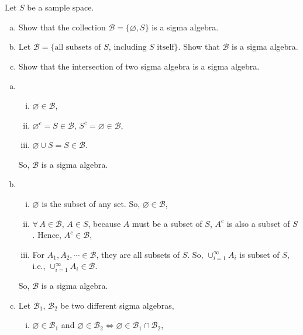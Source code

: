 \documentclass[12pt]{elegantbook}
\begin{document}
    \setcounter{exer}{10}
    \begin{exercise}
        Let $S$ be a sample space. 
        \begin{enumerate}[(a)]
            \item Show that the collection $\mathcal{B}=\{\varnothing, S\}$ is a sigma algebra. 
            \item Let $\mathcal{B}=\{\text{all subsets of $S$, including $S$ itself}\}$. Show that $\mathcal{B}$ is a sigma algebra. 
            \item Show that the intersection of two sigma algebra is a sigma algebra.
        \end{enumerate}
    \end{exercise}

    \begin{solution}
        \begin{enumerate}[(a)]
            \item \begin{enumerate}[(i)]
                \item $\varnothing \in \mathcal{B}$, 
                \item $\varnothing^c=S\in\mathcal{B}$, $S^c=\varnothing\in\mathcal{B}$, 
                \item $\varnothing\cup S=S\in\mathcal{B}$.
            \end{enumerate}
            So, $\mathcal{B}$ is a sigma algebra. 
            \item \begin{enumerate}[(i)]
                \item $\varnothing$ is the subset of any set. So, $\varnothing\in\mathcal{B}$, 
                \item $\forall\,A\in\mathcal{B}$, $A\in S$, because $A$ must be a subset of $S$, $A^c$ is also a subset of $S$. Hence, $A^c\in\mathcal{B}$, 
                \item For $A_1, A_2, \cdots \in\mathcal{B}$, they are all subsets of $S$. So, $\cup_{i=1}^\infty A_i$ is subset of $S$, i.e., $\cup_{i=1}^\infty A_i\in\mathcal{B}$. 
            \end{enumerate}
            So, $\mathcal{B}$ is a sigma algebra. 
            \item Let $\mathcal{B}_1$, $\mathcal{B}_2$ be two different sigma algebras, 
            \begin{enumerate}[(i)]
                \item $\varnothing\in\mathcal{B}_1$ and $\varnothing\in\mathcal{B}_2\Leftrightarrow\varnothing\in\mathcal{B}_1\cap\mathcal{B}_2$,  

\end{enumerate}
\end{enumerate}
\end{solution}
\end{document}
